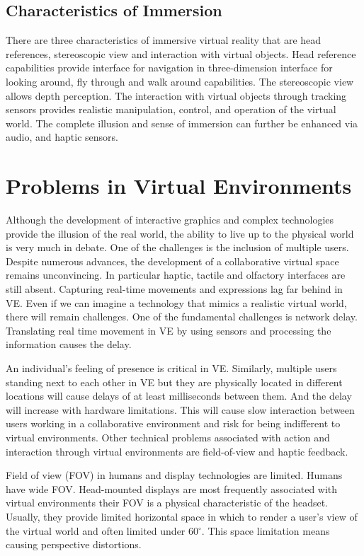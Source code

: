 \subsection{Characteristics of Immersion}
There are three characteristics of immersive virtual reality that are head references, stereoscopic view and interaction with virtual objects. Head reference capabilities provide interface for navigation in three-dimension interface for looking around, fly through and walk around capabilities. The stereoscopic view allows depth perception. The interaction with virtual objects through tracking sensors provides realistic manipulation, control, and operation of the virtual world. The complete illusion and sense of immersion can further be enhanced via audio, and haptic sensors.\cite{schubert2001experience}


\section{Problems in Virtual Environments}
Although the development of interactive graphics and complex technologies provide the illusion of the real world, the ability to live up to the physical world is very much in debate. One of the challenges is the inclusion of multiple users. Despite numerous advances, the development of a collaborative virtual space remains unconvincing. In particular haptic, tactile and olfactory interfaces are still absent. Capturing real-time movements and expressions lag far behind in VE. Even if we can imagine a technology that mimics a realistic virtual world, there will remain challenges. One of the fundamental challenges is network delay. Translating real time movement in VE by using sensors and processing the information causes the delay.\cite{khalid2016optimal}\par 
An individual’s feeling of presence is critical in VE. Similarly, multiple users standing next to each other in VE but they are physically located in different locations will cause delays of at least milliseconds between them. And the delay will increase with hardware limitations. This will cause slow interaction between users working in a collaborative environment and risk for being indifferent to virtual environments. Other technical problems associated with action and interaction through virtual environments are field-of-view and haptic feedback.\cite{fraser2000revealing}\par 
Field of view (FOV) in humans and display technologies are limited. Humans have wide FOV.  Head-mounted displays are most frequently associated with virtual environments their FOV is a physical characteristic of the headset. Usually, they provide limited horizontal space in which to render a user’s view of the virtual world and often limited under 60$^{\circ}$. This space limitation means causing perspective distortions\cite{carlbom1978planar}. 
